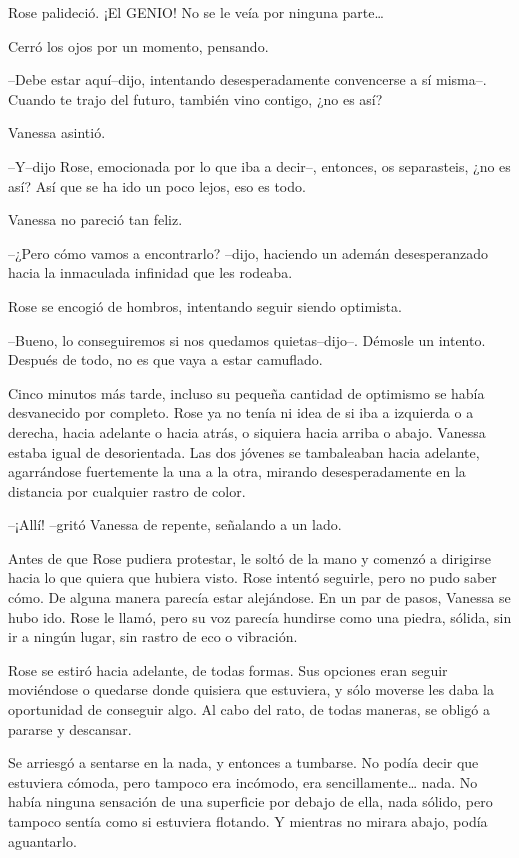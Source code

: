 Rose palideció. ¡El GENIO! No se le veía por ninguna parte\ldots{}

Cerró los ojos por un momento, pensando.

--Debe estar aquí--dijo, intentando desesperadamente convencerse a sí
misma--. Cuando te trajo del futuro, también vino contigo, ¿no es así?

Vanessa asintió.

--Y--dijo Rose, emocionada por lo que iba a decir--, entonces, os
separasteis, ¿no es así? Así que se ha ido un poco lejos, eso es todo.

Vanessa no pareció tan feliz.

--¿Pero cómo vamos a encontrarlo? --dijo, haciendo un ademán
desesperanzado hacia la inmaculada infinidad que les rodeaba.

Rose se encogió de hombros, intentando seguir siendo optimista.

--Bueno, lo conseguiremos si nos quedamos quietas--dijo--. Démosle un
intento. Después de todo, no es que vaya a estar camuflado.

Cinco minutos más tarde, incluso su pequeña cantidad de optimismo se
había desvanecido por completo. Rose ya no tenía ni idea de si iba a
izquierda o a derecha, hacia adelante o hacia atrás, o siquiera hacia
arriba o abajo. Vanessa estaba igual de desorientada. Las dos jóvenes se
tambaleaban hacia adelante, agarrándose fuertemente la una a la otra,
mirando desesperadamente en la distancia por cualquier rastro de color.

--¡Allí! --gritó Vanessa de repente, señalando a un lado.

Antes de que Rose pudiera protestar, le soltó de la mano y comenzó a
dirigirse hacia lo que quiera que hubiera visto. Rose intentó seguirle,
pero no pudo saber cómo. De alguna manera parecía estar alejándose. En
un par de pasos, Vanessa se hubo ido. Rose le llamó, pero su voz parecía
hundirse como una piedra, sólida, sin ir a ningún lugar, sin rastro de
eco o vibración.

Rose se estiró hacia adelante, de todas formas. Sus opciones eran seguir
moviéndose o quedarse donde quisiera que estuviera, y sólo moverse les
daba la oportunidad de conseguir algo. Al cabo del rato, de todas
maneras, se obligó a pararse y descansar.

Se arriesgó a sentarse en la nada, y entonces a tumbarse. No podía decir
que estuviera cómoda, pero tampoco era incómodo, era
sencillamente\ldots{} nada. No había ninguna sensación de una superficie
por debajo de ella, nada sólido, pero tampoco sentía como si estuviera
flotando. Y mientras no mirara abajo, podía aguantarlo.

